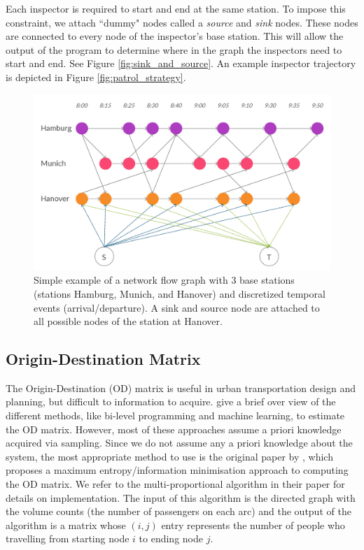 \documentclass[11pt]{article}
\begin{document}
Each inspector is required to start and end at the same station. To impose this constraint, we attach ``dummy" nodes called a \textit{source} and \textit{sink} nodes. These nodes are connected to every node of the inspector's base station. This will allow the output of the program to determine where in the graph the inspectors need to start and end. See Figure \ref{fig:sink_and_source}. An example inspector trajectory is depicted in Figure \ref{fig:patrol_strategy}.
\begin{figure}
    \centering
    \includegraphics[scale=0.15]{pics/Graph.jpg}
    \caption{Simple example of a network flow graph with 3 base stations (stations Hamburg, Munich, and Hanover) and discretized temporal events (arrival/departure). A sink and source node are attached to all possible nodes of the station at Hanover.}
    \label{fig:graph}
\end{figure}
\subsection{Origin-Destination Matrix}
\par The Origin-Destination (OD) matrix is useful in urban transportation design and planning, but difficult to information to acquire. \citet{bera_krishna_rao} give a brief over view of the different methods, like bi-level programming and machine learning, to estimate the OD matrix. However, most of these approaches assume a priori knowledge acquired via sampling. Since we do not assume any a priori knowledge about the system, the most appropriate method to use is the original paper by \citet{van_zuylen_willumsen_1980}, which proposes a maximum entropy/information minimisation  approach to computing the OD matrix. We refer to the multi-proportional algorithm in their paper for details on implementation. The input of this algorithm is the directed graph with the volume counts (the number of passengers on each arc) and the output of the algorithm is a matrix whose $(i,j)$ entry represents the number of people who travelling from starting node $i$ to ending node $j$.
\end{document}
